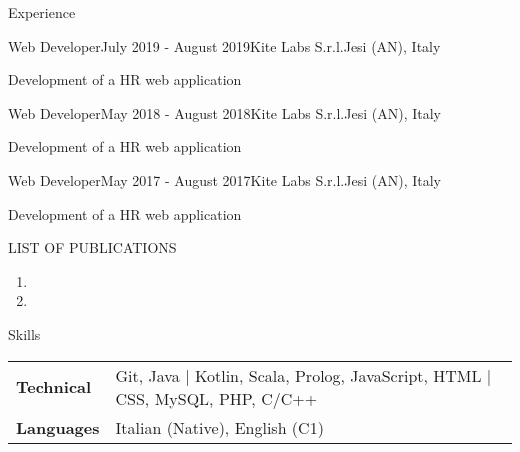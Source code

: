 \documentclass[
	11pt, %
]{resume} %
\begin{document}
\begin{rSection}{Experience}
    \begin{rSubsection}{Web Developer}{July 2019 - August 2019}{Kite Labs S.r.l.}{Jesi (AN), Italy}
	\item Development of a HR web application
    \end{rSubsection}

    \begin{rSubsection}{Web Developer}{May 2018 - August 2018}{Kite Labs S.r.l.}{Jesi (AN), Italy}
	\item Development of a HR web application
    \end{rSubsection}

    \begin{rSubsection}{Web Developer}{May 2017 - August 2017}{Kite Labs S.r.l.}{Jesi (AN), Italy}
	\item Development of a HR web application
    \end{rSubsection}
\end{rSection}


\begin{rSection}{LIST OF PUBLICATIONS}
    \begin{enumerate}
        \item {}
        \item {}
    \end{enumerate} 
\end{rSection}



\begin{rSection}{Skills}

    \begin{tabular}{@{} >{\bfseries}l @{\hspace{6ex}} l @{}}
        Technical & Git, Java | Kotlin, Scala, Prolog, JavaScript, HTML | CSS, {My}SQL, PHP, C/C++ \\
          Languages  & Italian (Native), English (C1) \\
    \end{tabular}
\end{rSection}





\end{document}

